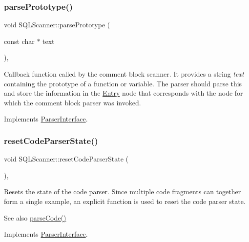 \subsubsection{\texorpdfstring{parsePrototype()}{parsePrototype()}}
{\footnotesize\ttfamily void S\+Q\+L\+Scanner\+::parse\+Prototype (\begin{DoxyParamCaption}\item[{const char $\ast$}]{text }\end{DoxyParamCaption})\hspace{0.3cm}{\ttfamily [inline]}, {\ttfamily [virtual]}}

Callback function called by the comment block scanner. It provides a string {\itshape text} containing the prototype of a function or variable. The parser should parse this and store the information in the \mbox{\hyperlink{class_entry}{Entry}} node that corresponds with the node for which the comment block parser was invoked. 

Implements \mbox{\hyperlink{class_parser_interface_a5ebf0f524a296845befa22c85a4cc80b}{Parser\+Interface}}.

\mbox{\label{class_s_q_l_scanner_ad419869977f9e82f027bf07df2c31287}} 
\subsubsection{\texorpdfstring{resetCodeParserState()}{resetCodeParserState()}}
{\footnotesize\ttfamily void S\+Q\+L\+Scanner\+::reset\+Code\+Parser\+State (\begin{DoxyParamCaption}{ }\end{DoxyParamCaption})\hspace{0.3cm}{\ttfamily [inline]}, {\ttfamily [virtual]}}

Resets the state of the code parser. Since multiple code fragments can together form a single example, an explicit function is used to reset the code parser state. \begin{DoxySeeAlso}{See also}
\mbox{\hyperlink{class_s_q_l_scanner_addaa1e6904f2cbd0e490580ed40fd89d}{parse\+Code()}} 
\end{DoxySeeAlso}


Implements \mbox{\hyperlink{class_parser_interface_aee4fccd1865a4e8a6b9f2896811104ca}{Parser\+Interface}}.

